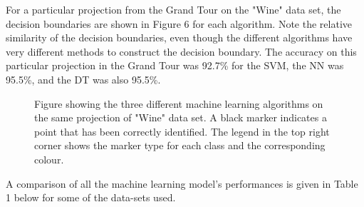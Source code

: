 \documentclass[a4paper,11pt,twoside]{article}
\begin{document}
For a particular projection from the Grand Tour on the "Wine" data set, the decision boundaries are shown in Figure 6 for each algorithm. Note the relative similarity of the decision boundaries, even though the different algorithms have very different methods to construct the decision boundary. The accuracy on this particular projection in the Grand Tour was 92.7\% for the SVM, the NN was 95.5\%, and the DT was also 95.5\%.
\begin{figure}[!htb]
    \centering
    \qquad
    \qquad
    \caption{Figure showing the three different machine learning algorithms on the same projection of "Wine" data set. A black marker indicates a point that has been correctly identified. The legend in the top right corner shows the marker type for each class and the corresponding colour.}%
    \label{fig:example}%
\end{figure}
\newpage

A comparison of all the machine learning model's performances is given in Table 1 below for some of the data-sets used.
\end{document}
